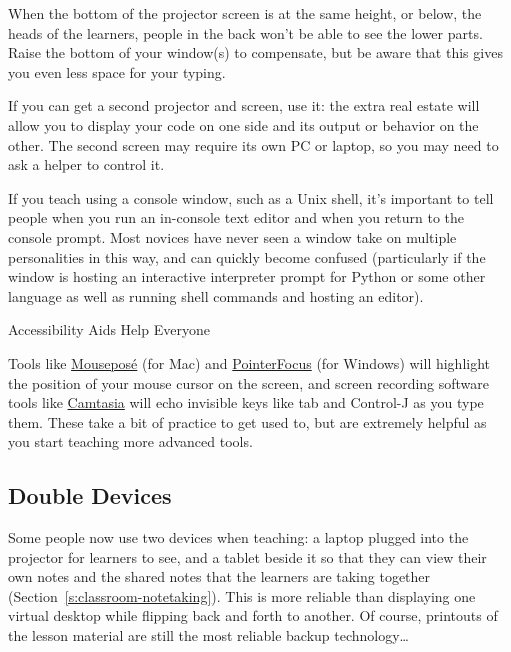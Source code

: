 When the bottom of the projector screen is at the same height, or below,
the heads of the learners, people in the back won't be able to see the
lower parts. Raise the bottom of your window(s) to compensate, but be
aware that this gives you even less space for your typing.

If you can get a second projector and screen, use it: the extra real
estate will allow you to display your code on one side and its output or
behavior on the other. The second screen may require its own PC or
laptop, so you may need to ask a helper to control it.

If you teach using a console window, such as a Unix shell, it's
important to tell people when you run an in-console text editor and when
you return to the console prompt. Most novices have never seen a window
take on multiple personalities in this way, and can quickly become
confused (particularly if the window is hosting an interactive
interpreter prompt for Python or some other language as well as running
shell commands and hosting an editor).

\begin{aside}{Accessibility Aids Help Everyone}

Tools like \href{https://boinx.com/mousepose/overview/}{Mousepos\'{e}} (for Mac) and
\href{http://www.pointerfocus.com/}{PointerFocus} (for Windows) will highlight the
position of your mouse cursor on the screen, and screen recording
software tools like \href{https://www.techsmith.com/video-editor.html}{Camtasia} will echo invisible keys
like tab and Control-J as you type them. These take a bit of
practice to get used to, but are extremely helpful as you start
teaching more advanced tools.

\end{aside}

\subsection*{Double Devices}

Some people now use two devices when teaching: a laptop plugged into the
projector for learners to see, and a tablet beside it so that they can
view their own notes and the shared notes that the learners are taking
together (Section~\ref{s:classroom-notetaking}). This is more reliable
than displaying one virtual desktop while flipping back and forth to
another. Of course, printouts of the lesson material are still the most
reliable backup technology\ldots{}

